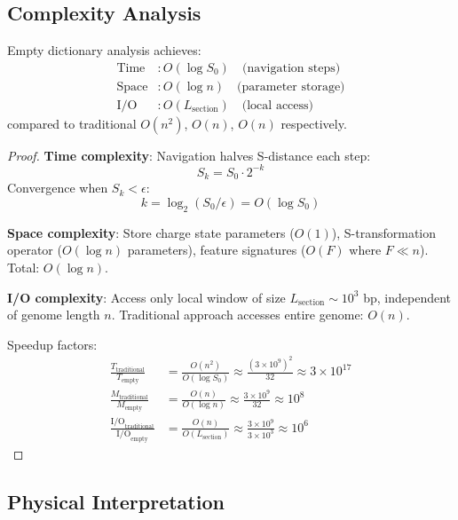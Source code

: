 \subsection{Complexity Analysis}

\begin{theorem}
\label{thm:empty_dictionary_complexity}
Empty dictionary analysis achieves:
\begin{align}
\text{Time} &: O(\log S_0) \quad \text{(navigation steps)} \\
\text{Space} &: O(\log n) \quad \text{(parameter storage)} \\
\text{I/O} &: O(L_{\text{section}}) \quad \text{(local access)}
\end{align}
compared to traditional $O(n^2)$, $O(n)$, $O(n)$ respectively.
\end{theorem}

\begin{proof}
\textbf{Time complexity}: Navigation halves S-distance each step:
\begin{equation}
S_k = S_0 \cdot 2^{-k}
\end{equation}
Convergence when $S_k < \epsilon$:
\begin{equation}
k = \log_2(S_0/\epsilon) = O(\log S_0)
\end{equation}

\textbf{Space complexity}: Store charge state parameters ($O(1)$), S-transformation operator ($O(\log n)$ parameters), feature signatures ($O(F)$ where $F \ll n$). Total: $O(\log n)$.

\textbf{I/O complexity}: Access only local window of size $L_{\text{section}} \sim 10^3$ bp, independent of genome length $n$. Traditional approach accesses entire genome: $O(n)$.

Speedup factors:
\begin{align}
\frac{T_{\text{traditional}}}{T_{\text{empty}}} &= \frac{O(n^2)}{O(\log S_0)} \approx \frac{(3 \times 10^9)^2}{32} \approx 3 \times 10^{17} \\
\frac{M_{\text{traditional}}}{M_{\text{empty}}} &= \frac{O(n)}{O(\log n)} \approx \frac{3 \times 10^9}{32} \approx 10^8 \\
\frac{\text{I/O}_{\text{traditional}}}{\text{I/O}_{\text{empty}}} &= \frac{O(n)}{O(L_{\text{section}})} \approx \frac{3 \times 10^9}{3 \times 10^3} \approx 10^6
\end{align}
\end{proof}

\subsection{Physical Interpretation}


